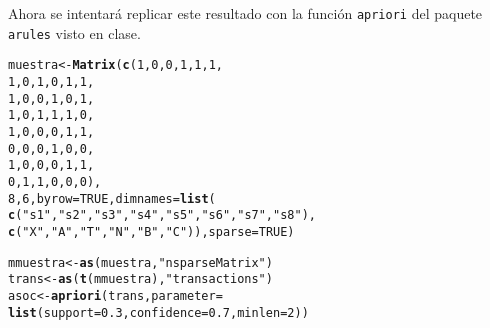 \documentclass[12pt]{report}\usepackage[]{graphicx}\usepackage[dvipsnames]{xcolor}
\makeatletter
\newcommand{\hlnum}[1]{\textcolor[rgb]{0.686,0.059,0.569}{#1}}%
\newcommand{\hlstr}[1]{\textcolor[rgb]{0.192,0.494,0.8}{#1}}%
\newcommand{\hlstd}[1]{\textcolor[rgb]{0.345,0.345,0.345}{#1}}%
\newcommand{\hlkwb}[1]{\textcolor[rgb]{0.69,0.353,0.396}{#1}}%
\newcommand{\hlkwc}[1]{\textcolor[rgb]{0.333,0.667,0.333}{#1}}%
\newcommand{\hlkwd}[1]{\textcolor[rgb]{0.737,0.353,0.396}{\textbf{#1}}}%
\newenvironment{kframe}{%
 \def\at@end@of@kframe{}%
 \ifinner\ifhmode%
  \def\at@end@of@kframe{\end{minipage}}%
  \begin{minipage}{\columnwidth}%
 \fi\fi%
 \def\FrameCommand##1{\hskip\@totalleftmargin \hskip-\fboxsep
 \colorbox{shadecolor}{##1}\hskip-\fboxsep
     \hskip-\linewidth \hskip-\@totalleftmargin \hskip\columnwidth}%
 \MakeFramed {\advance\hsize-\width
   \@totalleftmargin\z@ \linewidth\hsize
   \@setminipage}}%
 {\par\unskip\endMakeFramed%
 \at@end@of@kframe}
\newenvironment{knitrout}{}{} %
\makeatother
\begin{document}
			Ahora se intentará replicar este resultado con la función \texttt{apriori} del paquete \texttt{arules} visto en clase. 
			
\begin{knitrout}
\color{fgcolor}\begin{kframe}
\begin{alltt}
\hlstd{muestra} \hlkwb{<-} \hlkwd{Matrix}\hlstd{(}\hlkwd{c}\hlstd{(}\hlnum{1}\hlstd{,} \hlnum{0}\hlstd{,} \hlnum{0}\hlstd{,} \hlnum{1}\hlstd{,} \hlnum{1}\hlstd{,} \hlnum{1}\hlstd{,}
                        \hlnum{1}\hlstd{,} \hlnum{0}\hlstd{,} \hlnum{1}\hlstd{,} \hlnum{0}\hlstd{,} \hlnum{1}\hlstd{,} \hlnum{1}\hlstd{,}
                        \hlnum{1}\hlstd{,} \hlnum{0}\hlstd{,} \hlnum{0}\hlstd{,} \hlnum{1}\hlstd{,} \hlnum{0}\hlstd{,} \hlnum{1}\hlstd{,}
                        \hlnum{1}\hlstd{,} \hlnum{0}\hlstd{,} \hlnum{1}\hlstd{,} \hlnum{1}\hlstd{,} \hlnum{1}\hlstd{,} \hlnum{0}\hlstd{,}
                        \hlnum{1}\hlstd{,} \hlnum{0}\hlstd{,} \hlnum{0}\hlstd{,} \hlnum{0}\hlstd{,} \hlnum{1}\hlstd{,} \hlnum{1}\hlstd{,}
                        \hlnum{0}\hlstd{,} \hlnum{0}\hlstd{,} \hlnum{0}\hlstd{,} \hlnum{1}\hlstd{,} \hlnum{0}\hlstd{,} \hlnum{0}\hlstd{,}
                        \hlnum{1}\hlstd{,} \hlnum{0}\hlstd{,} \hlnum{0}\hlstd{,} \hlnum{0}\hlstd{,} \hlnum{1}\hlstd{,} \hlnum{1}\hlstd{,}
                        \hlnum{0}\hlstd{,} \hlnum{1}\hlstd{,} \hlnum{1}\hlstd{,} \hlnum{0}\hlstd{,} \hlnum{0}\hlstd{,} \hlnum{0}\hlstd{),}
\hlnum{8}\hlstd{,} \hlnum{6}\hlstd{,} \hlkwc{byrow} \hlstd{=} \hlnum{TRUE}\hlstd{,} \hlkwc{dimnames} \hlstd{=} \hlkwd{list}\hlstd{(}
\hlkwd{c}\hlstd{(}\hlstr{"s1"}\hlstd{,} \hlstr{"s2"}\hlstd{,} \hlstr{"s3"}\hlstd{,} \hlstr{"s4"}\hlstd{,} \hlstr{"s5"}\hlstd{,} \hlstr{"s6"}\hlstd{,} \hlstr{"s7"}\hlstd{,} \hlstr{"s8"}\hlstd{),}
\hlkwd{c}\hlstd{(}\hlstr{"X"}\hlstd{,} \hlstr{"A"}\hlstd{,} \hlstr{"T"}\hlstd{,} \hlstr{"N"}\hlstd{,} \hlstr{"B"}\hlstd{,} \hlstr{"C"}\hlstd{)),} \hlkwc{sparse}\hlstd{=}\hlnum{TRUE}\hlstd{)}

\hlstd{mmuestra} \hlkwb{<-} \hlkwd{as}\hlstd{(muestra,} \hlstr{"nsparseMatrix"}\hlstd{)}
\hlstd{trans} \hlkwb{<-} \hlkwd{as}\hlstd{(}\hlkwd{t}\hlstd{(mmuestra),} \hlstr{"transactions"}\hlstd{)}
\hlstd{asoc} \hlkwb{<-} \hlkwd{apriori}\hlstd{(trans,} \hlkwc{parameter} \hlstd{=}
        \hlkwd{list}\hlstd{(}\hlkwc{support} \hlstd{=} \hlnum{0.3}\hlstd{,} \hlkwc{confidence} \hlstd{=} \hlnum{0.7}\hlstd{,} \hlkwc{minlen} \hlstd{=} \hlnum{2}\hlstd{))}
\end{alltt}
\end{kframe}
\end{knitrout}
			
\end{document}
